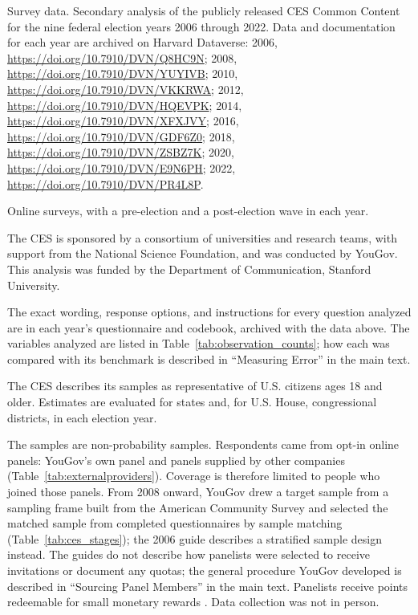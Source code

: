 \documentclass[12pt]{article}
\begin{document}
\begin{description}[style=unboxed, leftmargin=0pt, font=\normalfont\bfseries]
\item[Data source:] Survey data. Secondary analysis of the publicly released CES Common Content for the nine federal election years 2006 through 2022. Data and documentation for each year are archived on Harvard Dataverse:
2006, \url{https://doi.org/10.7910/DVN/Q8HC9N};
2008, \url{https://doi.org/10.7910/DVN/YUYIVB};
2010, \url{https://doi.org/10.7910/DVN/VKKRWA};
2012, \url{https://doi.org/10.7910/DVN/HQEVPK};
2014, \url{https://doi.org/10.7910/DVN/XFXJVY};
2016, \url{https://doi.org/10.7910/DVN/GDF6Z0};
2018, \url{https://doi.org/10.7910/DVN/ZSBZ7K};
2020, \url{https://doi.org/10.7910/DVN/E9N6PH};
2022, \url{https://doi.org/10.7910/DVN/PR4L8P}.

\item[Data collection strategy:] Online surveys, with a pre-election and a post-election wave in each year.

\item[Research sponsor and conductor:] The CES is sponsored by a consortium of universities and research teams, with support from the National Science Foundation, and was conducted by YouGov. This analysis was funded by the Department of Communication, Stanford University.

\item[Measurement tools/instruments:] The exact wording, response options, and instructions for every question analyzed are in each year's questionnaire and codebook, archived with the data above. The variables analyzed are listed in Table~\ref{tab:observation_counts}; how each was compared with its benchmark is described in ``Measuring Error'' in the main text.

\item[Population under study:] The CES describes its samples as representative of U.S. citizens ages 18 and older. Estimates are evaluated for states and, for U.S. House, congressional districts, in each election year.

\item[Methods used to generate and recruit the sample:] The samples are non-probability samples. Respondents came from opt-in online panels: YouGov's own panel and panels supplied by other companies (Table~\ref{tab:externalproviders}). Coverage is therefore limited to people who joined those panels. From 2008 onward, YouGov drew a target sample from a sampling frame built from the American Community Survey and selected the matched sample from completed questionnaires by sample matching (Table~\ref{tab:ces_stages}); the 2006 guide describes a stratified sample design instead. The guides do not describe how panelists were selected to receive invitations or document any quotas; the general procedure YouGov developed is described in ``Sourcing Panel Members'' in the main text. Panelists receive points redeemable for small monetary rewards \parencite{yougov_methodology}. Data collection was not in person.


\end{description}
\end{document}
